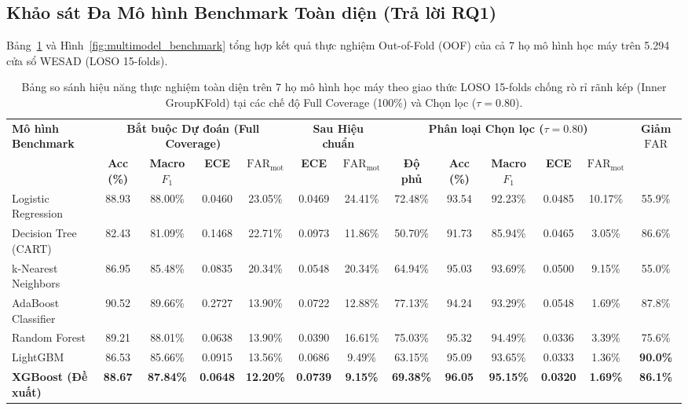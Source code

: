 \documentclass[conference]{IEEEtran}
\begin{document}
\subsection{Khảo sát Đa Mô hình Benchmark Toàn diện (Trả lời RQ1)}

Bảng~\ref{tab:benchmark_7_models} và Hình~\ref{fig:multimodel_benchmark} tổng hợp kết quả thực nghiệm Out-of-Fold (OOF) của cả 7 họ mô hình học máy trên 5.294 cửa sổ WESAD (LOSO 15-folds).

\begin{table}[t]
\caption{Bảng so sánh hiệu năng thực nghiệm toàn diện trên 7 họ mô hình học máy theo giao thức LOSO 15-folds chống rò rỉ rãnh kép (Inner GroupKFold) tại các chế độ Full Coverage (100\%) và Chọn lọc ($\tau = 0.80$).}
\label{tab:benchmark_7_models}
\centering
\begin{tabular}{lcccc|cc|ccccc|c}
\toprule
\multirow{2}{*}{\textbf{Mô hình Benchmark}} & \multicolumn{4}{c|}{\textbf{Bắt buộc Dự đoán (Full Coverage)}} & \multicolumn{2}{c|}{\textbf{Sau Hiệu chuẩn}} & \multicolumn{5}{c|}{\textbf{Phân loại Chọn lọc ($\tau = 0.80$)}} & \multirow{2}{*}{\textbf{Giảm $\text{FAR}$}} \\
& \textbf{Acc (\%)} & \textbf{Macro $F_1$} & \textbf{ECE} & $\text{FAR}_{\text{mot}}$ & \textbf{ECE} & $\text{FAR}_{\text{mot}}$ & \textbf{Độ phủ} & \textbf{Acc (\%)} & \textbf{Macro $F_1$} & \textbf{ECE} & $\text{FAR}_{\text{mot}}$ & \textbf{(\%)} \\
\midrule
Logistic Regression & 88.93 & 88.00\% & 0.0460 & 23.05\% & 0.0469 & 24.41\% & 72.48\% & 93.54 & 92.23\% & 0.0485 & 10.17\% & 55.9\% \\
Decision Tree (CART)& 82.43 & 81.09\% & 0.1468 & 22.71\% & 0.0973 & 11.86\% & 50.70\% & 91.73 & 85.94\% & 0.0465 & 3.05\% & 86.6\% \\
k-Nearest Neighbors & 86.95 & 85.48\% & 0.0835 & 20.34\% & 0.0548 & 20.34\% & 64.94\% & 95.03 & 93.69\% & 0.0500 & 9.15\% & 55.0\% \\
AdaBoost Classifier & 90.52 & 89.66\% & 0.2727 & 13.90\% & 0.0722 & 12.88\% & 77.13\% & 94.24 & 93.29\% & 0.0548 & 1.69\% & 87.8\% \\
Random Forest       & 89.21 & 88.01\% & 0.0638 & 13.90\% & 0.0390 & 16.61\% & 75.03\% & 95.32 & 94.49\% & 0.0336 & 3.39\% & 75.6\% \\
LightGBM            & 86.53 & 85.66\% & 0.0915 & 13.56\% & 0.0686 & 9.49\%  & 63.15\% & 95.09 & 93.65\% & 0.0333 & 1.36\% & \textbf{90.0\%} \\
\textbf{XGBoost (Đề xuất)} & \textbf{88.67} & \textbf{87.84\%} & \textbf{0.0648} & \textbf{12.20\%} & \textbf{0.0739} & \textbf{9.15\%} & \textbf{69.38\%} & \textbf{96.05} & \textbf{95.15\%} & \textbf{0.0320} & \textbf{1.69\%} & \textbf{86.1\%} \\
\bottomrule
\end{tabular}
\end{table}
\end{document}
